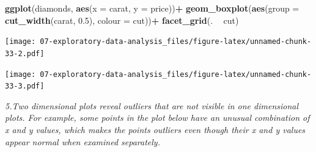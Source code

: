 \documentclass[]{book}
\newenvironment{Shaded}{\begin{snugshade}}{\end{snugshade}}
\newcommand{\CommentTok}[1]{\textcolor[rgb]{0.56,0.35,0.01}{\textit{#1}}}
\newcommand{\DataTypeTok}[1]{\textcolor[rgb]{0.13,0.29,0.53}{#1}}
\newcommand{\DecValTok}[1]{\textcolor[rgb]{0.00,0.00,0.81}{#1}}
\newcommand{\FloatTok}[1]{\textcolor[rgb]{0.00,0.00,0.81}{#1}}
\newcommand{\KeywordTok}[1]{\textcolor[rgb]{0.13,0.29,0.53}{\textbf{#1}}}
\newcommand{\NormalTok}[1]{#1}
\newcommand{\OperatorTok}[1]{\textcolor[rgb]{0.81,0.36,0.00}{\textbf{#1}}}
\newcommand{\StringTok}[1]{\textcolor[rgb]{0.31,0.60,0.02}{#1}}
\theoremstyle{definition}
\theoremstyle{definition}
\theoremstyle{definition}
\theoremstyle{remark}
\begin{document}
\begin{Shaded}
\begin{Highlighting}[]
\KeywordTok{ggplot}\NormalTok{(diamonds, }\KeywordTok{aes}\NormalTok{(}\DataTypeTok{x =}\NormalTok{ carat, }\DataTypeTok{y =}\NormalTok{ price))}\OperatorTok{+}
\StringTok{  }\KeywordTok{geom_boxplot}\NormalTok{(}\KeywordTok{aes}\NormalTok{(}\DataTypeTok{group =} \KeywordTok{cut_width}\NormalTok{(carat, }\FloatTok{0.5}\NormalTok{), }\DataTypeTok{colour =}\NormalTok{ cut))}\OperatorTok{+}
\StringTok{  }\KeywordTok{facet_grid}\NormalTok{(. }\OperatorTok{~}\StringTok{ }\NormalTok{cut)}
\end{Highlighting}
\end{Shaded}

\texttt{[image: 07-exploratory-data-analysis\_files/figure-latex/unnamed-chunk-33-2.pdf]}

\begin{Shaded}
\end{Shaded}

\texttt{[image: 07-exploratory-data-analysis\_files/figure-latex/unnamed-chunk-33-3.pdf]}

\emph{5.Two dimensional plots reveal outliers that are not visible in
one dimensional plots. For example, some points in the plot below have
an unusual combination of x and y values, which makes the points
outliers even though their x and y values appear normal when examined
separately.}
\end{document}
